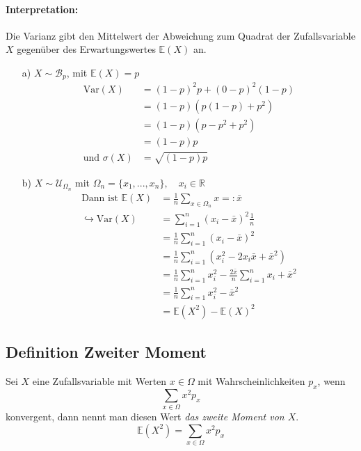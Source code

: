 \documentclass[12pt,a4paper]{article}
\begin{document}
 	\paragraph{Interpretation:}
 	Die Varianz gibt den Mittelwert der Abweichung zum Quadrat der Zufallsvariable $X$ gegenüber des Erwartungswertes $\mathbb{E}(X)$ an.
 	\begin{itemize}
 	\item[a)] $X\sim\mathcal{B}_p$, mit $\mathbb{E}(X)=p$
 	\begin{equation}
 	\begin{split}
 	\text{Var}(X) & = \left(1-p\right)^2 p+\left(0-p\right)^2\left(1-p\right)\\
 	& = \left(1-p\right)\left(p\left(1-p\right)+p^2\right)\\
 	& = \left(1-p\right)\left(p-p^2 + p^2\right)\\
 	& = \left(1-p\right)p\\
 	\text{und } \sigma(X)& = \sqrt{\left(1-p\right)p}
 	\end{split}
 	\end{equation}
 	
 	\item[b)] $X\sim\mathcal{U}_{\Omega_n}$ mit $\Omega_n = \{x_1,...,x_n\},\quad x_i\in\mathbb{R}$
 	\begin{equation*}
 	\begin{split}
 	\text{Dann ist } \mathbb{E}(X)& =\frac{1}{n}\sum_{x\in\Omega_n}x=:\bar{x}\\
 	\hookrightarrow\text{Var}(X)& = \sum_{i=1}^n\left(x_i-\bar{x}\right)^2\frac{1}{n}\\
 	& = \frac{1}{n}\sum_{i=1}^n\left(x_i-\bar{x}\right)^2\\
 	& = \frac{1}{n}\sum_{i=1}^n\left(x_i^2-2x_i\bar{x}+\bar{x}^2\right)\\
 	& = \frac{1}{n}\sum_{i=1}^n x^2_i -\frac{2\bar{x}}{n}\sum_{i=1}^n x_i +\bar{x}^2\\
 	& = \frac{1}{n}\sum_{i=1}^n x_i^2 -\bar{x}^2\\
 	& = \mathbb{E}(X^2)-\mathbb{E}(X)^2
 	\end{split}
 	\end{equation*}
 	\end{itemize}
 	
 	\subsection{Definition Zweiter Moment}
 	Sei $X$ eine Zufallsvariable mit Werten $x\in\Omega$ mit Wahrscheinlichkeiten $p_x$, wenn 
 	$$\sum_{x\in\Omega}x^2p_x$$ 
 	konvergent, dann nennt man diesen Wert \textit{das zweite Moment von $X$}.
 	$$\mathbb{E}(X^2)=\sum_{x\in\Omega}x^2p_x$$
\end{document}
